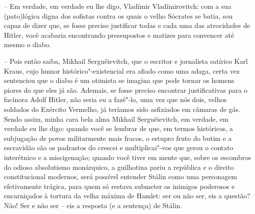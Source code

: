 -- Em verdade, em verdade eu lhe digo, Vladímir Vladímirovitch: com a
sua (pato)lógica digna dos sofistas contra os quais o velho Sócrates se
batia, sou capaz de dizer que, se fosse preciso justificar todas e cada
uma das atrocidades de Hitler, você acabaria encontrando pressupostos e
matizes para convencer até mesmo o diabo.

-- Pois então saiba, Mikhail Serguêievitch, que o escritor e jornalista
satírico Karl Kraus, cujo humor histórico"-existencial era afiado como
uma adaga, certa vez sentenciou que o diabo é um otimista se imagina que
pode tornar os homens piores do que eles já são. Ademais, se fosse
preciso encontrar justificativas para o facínora Adolf Hitler, não seria
eu a fazê"-lo, uma vez que nós dois, velhos soldados do Exército
Vermelho, já teríamos sido asfixiados em câmaras de gás. Sendo assim,
minha cara bela alma Mikhail Serguêievitch, em verdade, em verdade eu
lhe digo: quando você se lembrar de que, em termos históricos, a
subjugação de povos militarmente mais fracos, o estupro fruto do butim e
a escravidão são os padrastos do crescei e multiplicai"-vos que gerou o
contato interétnico e a miscigenação; quando você tiver em mente que,
sobre os escombros do odioso absolutismo monárquico, a guilhotina pariu
a república e o direito constitucional modernos, será possível entender
Stálin como uma personagem efetivamente trágica, para quem só restava
submeter os inimigos poderosos e encarniçados à tortura da velha máxima
de Hamlet: ser ou não ser, eis a questão? Não! Ser e não ser -- eis a
resposta (e a sentença) de Stálin.

\pagebreak
\clearpage
\thispagestyle{empty}


